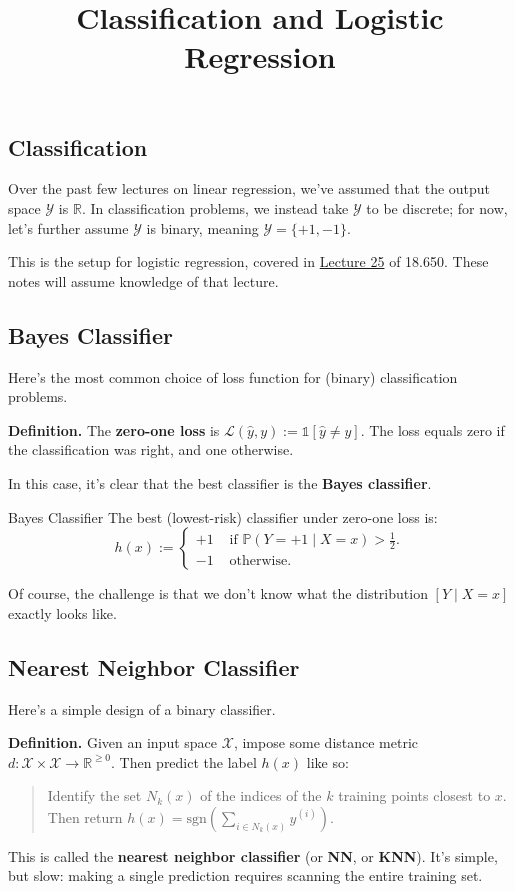 \title{Classification and Logistic Regression}



\subsection{Classification}

Over the past few lectures on linear regression,
we've assumed that the output space $\mathcal{Y}$ is $\mathbb{R}$.
In classification problems,
we instead take $\mathcal{Y}$ to be discrete;
for now, let's further assume $\mathcal{Y}$ is binary,
meaning $\mathcal{Y} = \{+1, -1\}$.

This is the setup for logistic regression,
covered in \href{/18.650/lectures/25/}{Lecture 25} of 18.650.
These notes will assume knowledge of that lecture.

\subsection{Bayes Classifier}

Here's the most common choice of loss function
for (binary) classification problems.

\textbf{Definition.}
The \textbf{zero-one loss} is
$\mathcal{L}(\hat{y}, y) := \mathds{1}[\hat{y} \neq y]$.
The loss equals zero if the classification was right,
and one otherwise.

In this case, it's clear that the best classifier
is the \textbf{Bayes classifier}.

\begin{theorem}{Bayes Classifier}
    The best (lowest-risk) classifier under zero-one loss is:
    \[ h(x) := \begin{cases}
    +1 & \text{ if } \mathbb{P}(Y = +1 \mid X = x) > \frac{1}{2}. \\
    -1 & \text{ otherwise}.
    \end{cases} \]
\end{theorem}

Of course, the challenge is that
we don't know what the distribution $[Y \mid X = x]$
exactly looks like.

\subsection{Nearest Neighbor Classifier}

Here's a simple design of a binary classifier.

\textbf{Definition.}
Given an input space $\mathcal{X}$, impose some distance metric
$d \colon \mathcal{X} \times \mathcal{X} \to \mathbb{R}^{\geq 0}$.
Then predict the label $h(x)$ like so:
\begin{quote}
    Identify the set $N_k(x)$
    of the indices of the $k$ training points closest to $x$.
    Then return $h(x) = \mathrm{sgn}\left(\sum_{i \in N_k(x)} y^{(i)}\right)$.
\end{quote}
This is called the \textbf{nearest neighbor classifier}
(or \textbf{NN}, or \textbf{KNN}).
It's simple, but slow:
making a single prediction requires
scanning the entire training set.

